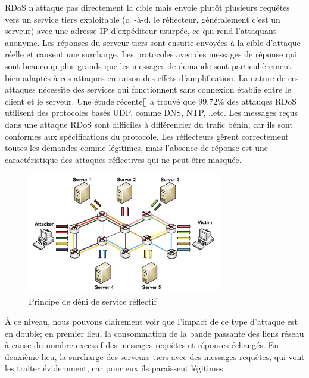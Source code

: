 RDoS n’attaque pas directement la cible mais envoie plutôt plusieurs requêtes vers un service tiers exploitable (c. -à-d. le réflecteur, généralement c'est un serveur) avec une adresse IP d’expéditeur usurpée, ce qui rend l'attaquant anonyme. Les réponses du serveur tiers sont ensuite envoyées à la cible d’attaque réelle et causent une surcharge. Les protocoles avec des messages de réponse qui sont beaucoup plus grands que les messages de demande sont particulièrement bien adaptés à ces attaques en raison des effets d’amplification. La nature de ces attaques nécessite des services qui fonctionnent sans connexion établie entre le client et le serveur. Une étude récente[\cite{23}] a trouvé que $ 99.72\% $ des attauqes RDoS utilisent des protocoles basés UDP, comme DNS, NTP, ..etc. Les messages reçus dans une attaque RDoS sont difficiles à différencier du trafic bénin, car ils sont conformes aux spécifications du protocole. Les réflecteurs gèrent correctement toutes les demandes comme légitimes, mais l’absence de réponse est une caractéristique des attaques réflectives qui ne peut être masquée.

\begin{figure}[h]
\centering
\includegraphics[width=0.75\textwidth]{Figures/rDoS}
\decoRule
\caption{Principe de déni de service réflectif}
\label{fig:rDoS}
\end{figure} 

À ce niveau, nous pouvons clairement voir que l'impact de ce type d'attaque est en double; en premier lieu, la consommation de la bande passante des liens réseau à cause du nombre excessif des messages requêtes et réponses échangés. En deuxième lieu, la surcharge des serveurs tiers avec des messages requêtes, qui vont les traiter évidemment, car pour eux ils paraissent légitimes. 

